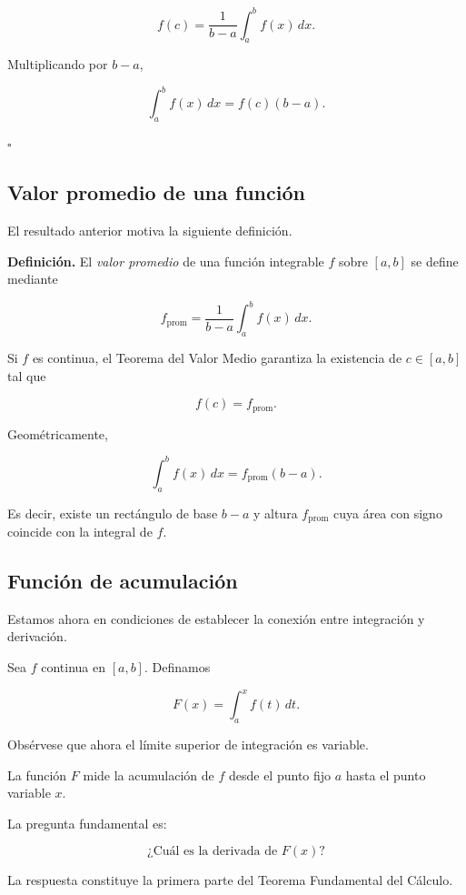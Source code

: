 \documentclass[12pt]{article}
\begin{document}
\[
f(c)
=
\frac{1}{b-a}
\int_a^b f(x)\,dx.
\]

Multiplicando por $b-a$,

\[
\boxed{
\int_a^b f(x)\,dx
=
f(c)(b-a).
}
\]

\hfill$\square$

\subsection{Valor promedio de una función}

El resultado anterior motiva la siguiente definición.

\textbf{Definición.}
El \emph{valor promedio} de una función integrable $f$ sobre $[a,b]$ se
define mediante

\[
\boxed{
f_{\mathrm{prom}}
=
\frac{1}{b-a}
\int_a^b f(x)\,dx.
}
\]

Si $f$ es continua, el Teorema del Valor Medio garantiza la existencia de
$c\in[a,b]$ tal que

\[
f(c)=f_{\mathrm{prom}}.
\]

Geométricamente,

\[
\int_a^b f(x)\,dx
=
f_{\mathrm{prom}}(b-a).
\]

Es decir, existe un rectángulo de base $b-a$ y altura
$f_{\mathrm{prom}}$ cuya área con signo coincide con la integral de $f$.

\subsection{Función de acumulación}

Estamos ahora en condiciones de establecer la conexión entre integración
y derivación.

Sea $f$ continua en $[a,b]$. Definamos

\[
F(x)
=
\int_a^x f(t)\,dt.
\]

Obsérvese que ahora el límite superior de integración es variable.

La función $F$ mide la acumulación de $f$ desde el punto fijo $a$ hasta
el punto variable $x$.

La pregunta fundamental es:

\[
\boxed{\text{¿Cuál es la derivada de }F(x)?}
\]

La respuesta constituye la primera parte del Teorema Fundamental del
Cálculo.
\end{document}
